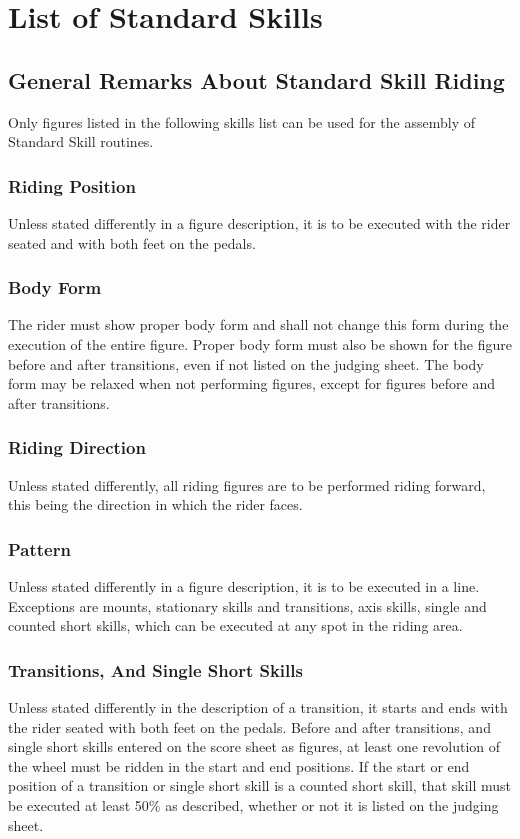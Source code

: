 \chapter{List of Standard Skills \label{chap:freestyle_std-skills-list}}

\section{General Remarks About Standard Skill Riding  }
Only figures listed in the following skills list can be used for the assembly of Standard Skill routines.

\subsection{Riding Position}
Unless stated differently in a figure description, it is to be executed with the rider seated and with both feet on the pedals.

\subsection{Body Form}
The rider must show proper body form and shall not change this form during the execution of the entire figure.
Proper body form must also be shown for the figure before and after transitions, even if not listed on the judging sheet.
The body form may be relaxed when not performing figures, except for figures before and after transitions.

\subsection{Riding Direction}
Unless stated differently, all riding figures are to be performed riding forward, this being the direction in which the rider faces.

\subsection{Pattern}
Unless stated differently in a figure description, it is to be executed in a line.
Exceptions are mounts, stationary skills and transitions, axis skills, single and counted short skills, which can be executed at any spot in the riding area.

\subsection{Transitions, And Single Short Skills}
Unless stated differently in the description of a transition, it starts and ends with the rider seated with both feet on the pedals.
Before and after transitions, and single short skills entered on the score sheet as figures, at least one revolution of the wheel must be ridden in the start and end positions.
If the start or end position of a transition or single short skill is a counted short skill, that skill must be executed at least 50\% as described, whether or not it is listed on the judging sheet.

